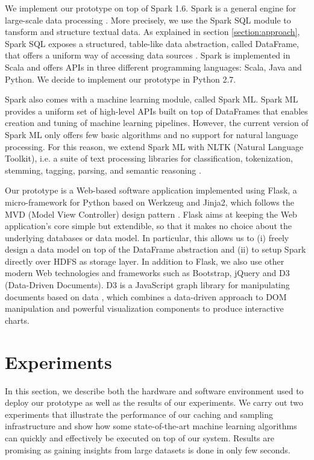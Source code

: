 \documentclass[10pt, a4paper, twocolumn]{article} %
\begin{document}
We implement our prototype on top of Spark 1.6. Spark is a general engine for large-scale data processing \cite{spark, rdd}. More precisely, we use the Spark SQL module to tansform and structure textual data. As explained in section \ref{section:approach}, Spark SQL exposes a structured, table-like data abstraction, called DataFrame, that offers a uniform way of accessing data sources \cite{spark-sql}.
Spark is implemented in Scala and offers APIs in three different programming languages: Scala, Java and Python. We decide to implement our prototype in Python 2.7.

Spark also comes with a machine learning module, called Spark ML. 
Spark ML provides a uniform set of high-level APIs built on top of DataFrames that enables creation and tuning of machine learning pipelines. However, the current version of Spark ML only offers few basic algorithms and no support for natural language processing. For this reason, we extend Spark ML with NLTK (Natural Language Toolkit), i.e. a suite of text processing libraries for classification, tokenization, stemming, tagging, parsing, and semantic reasoning \cite{nltk-book, nltk}. 

Our prototype is a Web-based software application implemented using Flask, a micro-framework for Python based on Werkzeug and Jinja2, which follows the MVD (Model View Controller) design pattern \cite{flask}. Flask aims at keeping the Web application’s core simple but extendible, so that it makes no choice about the underlying databases or data model. In particular, this allows us to (i) freely design a data model on top of the DataFrame abstraction and (ii) to setup Spark directly over HDFS as storage layer. 
In addition to Flask, we also use other modern Web technologies and frameworks such as Bootstrap, jQuery and D3 (Data-Driven Documents). D3 is a JavaScript graph library for manipulating documents based on data \cite{d3}, which combines a data-driven approach to DOM manipulation and powerful visualization components to produce interactive charts.


\section{Experiments}
\label{section:experiments}

In this section, we describe both the hardware and software environment used to deploy our prototype as well as the results of our experiments. We carry out two experiments that illustrate the performance of our caching and sampling infrastructure and show how some state-of-the-art machine learning algorithms can quickly and effectively be executed on top of our system. Results are promising as gaining insights from large datasets is done in only few seconds.
\end{document}
